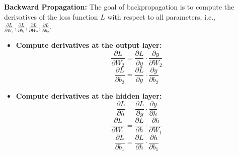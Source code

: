 \textbf{Backward Propagation:}
The goal of backpropagation is to compute the derivatives of the loss function \( L \) with respect to all parameters, i.e., \( \frac{\partial L}{\partial W_1}, \frac{\partial L}{\partial b_1}, \frac{\partial L}{\partial W_2}, \frac{\partial L}{\partial b_2} \).

\begin{itemize}
   \item \textbf{Compute derivatives at the output layer:}
   \[
   \frac{\partial L}{\partial W_2} = \frac{\partial L}{\partial y} \cdot \frac{\partial y}{\partial W_2}
   \]
   \[
   \frac{\partial L}{\partial b_2} = \frac{\partial L}{\partial y} \cdot \frac{\partial y}{\partial b_2}
   \]

   \item \textbf{Compute derivatives at the hidden layer:}
   \[
   \frac{\partial L}{\partial h} = \frac{\partial L}{\partial y} \cdot \frac{\partial y}{\partial h}
   \]
   \[
   \frac{\partial L}{\partial W_1} = \frac{\partial L}{\partial h} \cdot \frac{\partial h}{\partial W_1}
   \]
   \[
   \frac{\partial L}{\partial b_1} = \frac{\partial L}{\partial h} \cdot \frac{\partial h}{\partial b_1}
   \]
\end{itemize}


